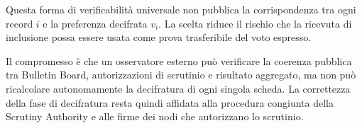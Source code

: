 \documentclass[a4paper,12pt]{article}
\begin{document}
Questa forma di verificabilit\`a universale non pubblica la corrispondenza tra ogni record \(i\) e la preferenza decifrata \(v_i\).
La scelta riduce il rischio che la ricevuta di inclusione possa essere usata come prova trasferibile del voto espresso.

Il compromesso \`e che un osservatore esterno pu\`o verificare la coerenza pubblica tra Bulletin Board, autorizzazioni di scrutinio e risultato aggregato, ma non pu\`o ricalcolare autonomamente la decifratura di ogni singola scheda.
La correttezza della fase di decifratura resta quindi affidata alla procedura congiunta della Scrutiny Authority e alle firme dei nodi che autorizzano lo scrutinio.
\end{document}
